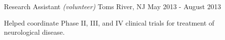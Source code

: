 \begin{cventries}
    {Research Assistant \textnormal{\small{\textit{(volunteer)}}}}
    {Toms River, NJ}
    {May 2013 - August 2013}
    {\begin{cvitems}
        \item{Helped coordinate Phase II, III, and IV clinical trials for treatment of
            neurological disease.}
    \end{cvitems}}
    
\end{cventries}
